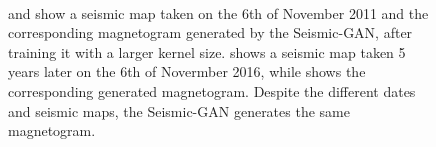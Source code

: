 \documentclass[11pt,a4paper,onecolumn]{report}
\begin{document}
\begin{figure}[t]%
  \centering
   \\
  \caption[]{ and 
  show a seismic map taken on the 6th of November 2011 and the corresponding
  magnetogram generated by the Seismic-GAN, after training it with a larger
  kernel size.  shows a seismic map taken 5 years
  later on the 6th of Novermber 2016, while  shows
  the corresponding generated magnetogram. Despite the different dates and
  seismic maps, the Seismic-GAN generates the same magnetogram.}
  \label{fig:mode_collapse}
\end{figure}
\end{document}
